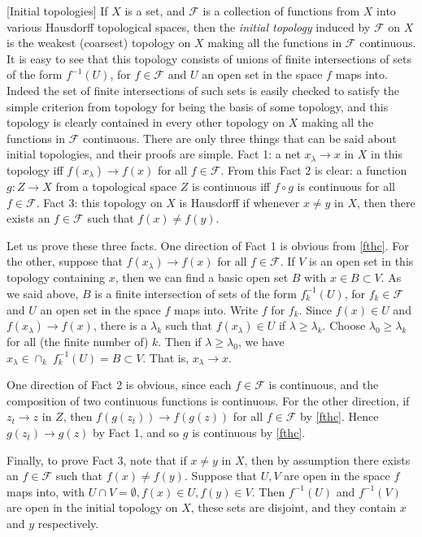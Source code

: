 \documentclass[12pt]{article}
\begin{document}
[Initial topologies] If $X$ is a set, and ${\mathcal F}$ is a
collection of functions from $X$ into various Hausdorff topological
spaces, then the {\em initial topology} induced by ${\mathcal F}$ on
$X$ is the weakest (coarsest) topology on $X$ making all the
functions in ${\mathcal F}$ continuous. It is easy to see that this
topology consists of unions of finite intersections of sets of the
form $f^{-1}(U)$, for $f \in {\mathcal F}$ and $U$ an open set in
the space $f$ maps into.  Indeed the set of finite intersections of
such sets is easily checked to satisfy the simple criterion from
topology for being the basis of some topology, and this topology is
clearly contained in every other topology on $X$ making all the
functions in ${\mathcal F}$ continuous. There are only three things
that can be said about initial topologies, and their proofs are
simple.  Fact 1: a net $x_\lambda \to x$ in $X$ in this topology iff
$f(x_\lambda) \to f(x)$ for all $f \in {\mathcal F}$.  From this
Fact 2 is clear: a function $g : Z \to X$ from a topological space
$Z$ is continuous iff $f \circ g$ is continuous for all $f \in
{\mathcal F}$.  Fact 3: this topology on $X$ is Hausdorff if
whenever $x \neq y$ in $X$, then there exists an $f \in {\mathcal
F}$ such that $f(x) \neq f(y)$.

Let us prove these three facts.  One direction of Fact 1 is obvious
from \ref{fthc}.  For the other, suppose that $f(x_\lambda) \to
f(x)$ for all $f \in {\mathcal F}$.  If $V$ is an open set in this
topology containing $x$, then we can find a basic open set $B$ with
$x \in B \subset V$.  As we said above, $B$ is a finite intersection
of sets of the form $f_k^{-1}(U)$, for $f_k \in {\mathcal F}$ and
$U$ an open set in the space $f$ maps into.  Write $f$ for $f_k$.
Since $f(x) \in U$ and $f(x_\lambda) \to f(x)$, there is  a
$\lambda_k$ such that $f(x_\lambda) \in U$ if $\lambda \geq
\lambda_k$.   Choose $\lambda_0 \geq \lambda_k$ for all (the finite
number of) $k$.  Then if $\lambda \geq \lambda_0$, we have
$x_\lambda \in \cap_k \; f_k^{-1}(U) = B \subset V$.  That is,
$x_\lambda \to x$.


One direction of Fact 2 is obvious, since each $f \in {\mathcal F}$
is continuous, and the composition of two continuous functions is
continuous.   For the other  direction, if $z_t \to z$ in $Z$, then
$f(g(z_t)) \to f(g(z))$ for all $f \in {\mathcal F}$ by \ref{fthc}.
Hence $g(z_t)  \to g(z)$ by
 Fact 1, and so $g$ is continuous by \ref{fthc}.

Finally, to prove Fact 3, note that if $x \neq y$ in $X$, then by
assumption there exists an $f \in {\mathcal F}$ such that $f(x) \neq
f(y)$.  Suppose that $U, V$ are open in the space $f$ maps into,
with $U \cap V = \emptyset, f(x) \in U, f(y) \in V$.    Then
$f^{-1}(U)$ and $f^{-1}(V)$ are open in the initial topology on $X$,
these sets are disjoint, and they contain $x$ and $y$ respectively.
\end{document}

